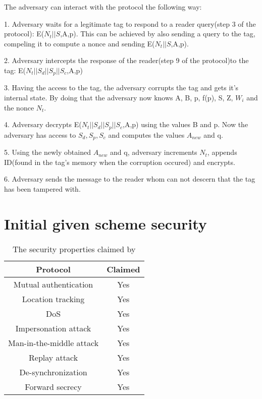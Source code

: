     The adversary can interact with the protocol the following way:

    1. Adversary waits for a legitimate tag to respond to a reader query(step 3 of the protocol): E($N_t||S$,A,p).
    This can be achieved by also sending a query to the tag, compeling it to compute a nonce and sending E($N_t||S$,A,p).
    
    2. Adversary intercepts the response of the reader(step 9 of the protocol)to the tag: E($N_t||S_d||S_p||S_c$,A,p)
    
    3. Having the access to the tag, the adversary corrupts the tag and gets it's internal state. By doing that the adversary now knows A, B, p, f(p), S, Z, $W_i$ and the nonce $N_t$.
    
    4. Adversary decrypts E($N_t||S_d||S_p||S_c$,A,p) using the values B and p. Now the adversary has access to $S_d, S_p, S_c$ and computes the values $A_{new}$ and q.
    
    5. Using the newly obtained $A_{new}$ and q, adversary increments $N_t$, appends ID(found in the tag's memory when the corruption occured) and encrypts.
    
    6. Adversary sends the message to the reader whom can not descern that the tag has been tampered with.

\section{Initial given scheme security}
\begin{table}[H]
    \centering
    \caption{The security properties claimed by \cite{BOM}}
    \begin{tabular}{cc}
        \hline
        Protocol & Claimed \\
        \hline
        Mutual authentication & Yes \\
        Location tracking & Yes \\
        DoS & Yes \\
        Impersonation attack & Yes  \\
        Man-in-the-middle attack & Yes  \\
        Replay attack & Yes  \\
        De-synchronization & Yes  \\
        Forward secrecy & Yes \\
        \hline
    \end{tabular}
\end{table}

